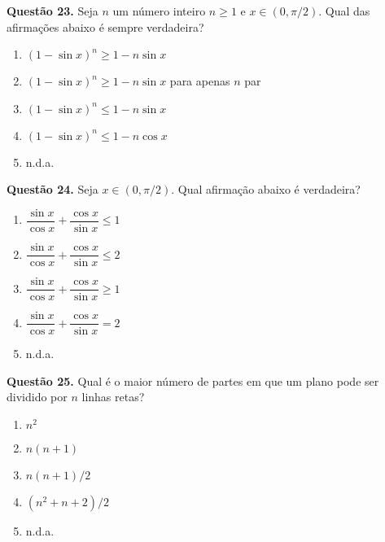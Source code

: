 \documentclass[11pt]{article}
\begin{document}
\textbf{Questão 23.} Seja $n$ um número inteiro $n \geq  1$ e $x \in (0, \pi/2)$. Qual das afirmações abaixo é sempre verdadeira? 

\begin{enumerate}[\bf A (\quad)]
    \item $(1 - \sin x)^n \geq 1 - n \sin x$
    \item $(1 - \sin x)^n \geq 1 - n \sin x$ para apenas $n$ par
    \item $(1 - \sin x)^n \leq 1 - n \sin x$
    \item $(1 - \sin x)^n \leq 1 - n \cos x$
    \item n.d.a.
\end{enumerate}


\textbf{Questão 24.} Seja $x \in (0, \pi/2)$. Qual afirmação abaixo é verdadeira?

\begin{multicols}{3}
    \begin{enumerate}[\bf A (\quad)]
        \item $\dfrac{\sin x}{\cos x} + \dfrac{\cos x}{\sin x} \leq 1$
        \item $\dfrac{\sin x}{\cos x} + \dfrac{\cos x}{\sin x} \leq 2$
        \item $\dfrac{\sin x}{\cos x} + \dfrac{\cos x}{\sin x} \geq 1$
        \item $\dfrac{\sin x}{\cos x} + \dfrac{\cos x}{\sin x} = 2$
        \item n.d.a.
    \end{enumerate}
\end{multicols}

\textbf{Questão 25.} Qual é o maior número de partes em que um plano pode ser dividido por $n$ linhas retas? 

\begin{multicols}{3}
    \begin{enumerate}[\bf A (\quad)]
        \item $n^2$
        \item $n(n+1)$
        \item $n(n+1)/2$
        \item $(n^2 + n +2)/2$
        \item n.d.a.
    \end{enumerate}
\end{multicols}
\end{document}
